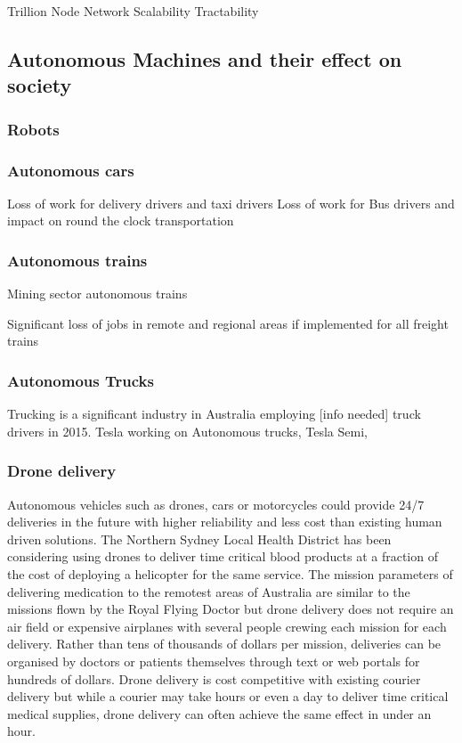 Trillion Node Network\cite{RefWorks:321}
Scalability
Tractability

\subsection{Autonomous Machines and their effect on society}
\subsubsection{Robots}


\subsubsection{Autonomous cars}
Loss of work for delivery drivers and taxi drivers
Loss of work for Bus drivers and impact on round the clock transportation


\subsubsection{Autonomous trains}
Mining sector autonomous trains

Significant loss of jobs in remote and regional areas if implemented for all freight trains
\subsubsection{Autonomous Trucks}
Trucking is a significant industry in Australia employing [info needed] truck drivers in 2015.
Tesla working on Autonomous trucks, Tesla Semi, 
\subsubsection{Drone delivery}
Autonomous vehicles such as drones, cars or motorcycles could provide 24/7 deliveries in the future with higher reliability and less cost than existing human driven solutions. The Northern Sydney Local Health District has been considering using drones to deliver time critical blood products at a fraction of the cost of deploying a helicopter for the same service.\cite{RefWorks:409} The mission parameters of delivering medication to the remotest areas of Australia are similar to the missions flown by the Royal Flying Doctor but drone delivery does not require an air field or expensive airplanes with several people crewing each mission for each delivery. Rather than tens of thousands of dollars per mission, deliveries can be organised by doctors or patients themselves through text or web portals for hundreds of dollars. Drone delivery is cost competitive with existing courier delivery but while a courier may take hours or even a day to deliver time critical medical supplies, drone delivery can often achieve the same effect in under an hour. 

